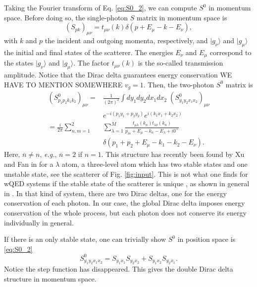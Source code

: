 \documentclass[aps,pra,reprint,amsmath,amssymb]{revtex4-1}
\begin{document}
Taking the Fourier transform of Eq. \eqref{eq:S0_2}, we can compute $S^0$ in momentum space. Before doing so, the single-photon $S$ matrix in momentum space is
\begin{equation}\label{eq:S01_p}
(S_{pk})_{\mu\nu}=t_{\mu\nu}(k)\delta(p+E_\mu-k-E_\nu),
\end{equation}
with $k$ and $p$ the incident and outgoing momenta, respectively, and $|g_\nu\rangle$ and $|g_\mu\rangle$ the initial and final states of the scatterer. The energies $E_\nu$ and $E_\mu$ correspond to the states $|g_\nu\rangle$ and $|g_\mu\rangle$. The factor $t_{\mu\nu}(k)$ is the so-called transmission amplitude. Notice that the Dirac delta guarantees energy conservation {\color{blue}WE HAVE TO MENTION SOMEWHERE $v_g=1$}. Then, the two-photon $S^0$ matrix is
\begin{align}\label{eq:S0_2p}
(S_{p_1p_2k_1k_2}^0)_{\mu\nu}=&\frac{1}{(2\pi)^2}\int  dy_1dy_2dx_1dx_2\; (S_{y_1y_2x_1x_2}^0)_{\mu\nu}\nonumber\\
& e^{-i(p_1y_1+p_2y_2)}  e^{i(k_1x_1+k_2x_2)} \nonumber\\
=  \frac{i}{2\pi}\sum_{n,m=1}^2 &\sum_{\lambda=1}^M  \frac{t_{\mu\lambda}(k_n) t_{\lambda\nu}(k_{\overline{n}})}{p_m+E_\mu -k_n -E_\lambda + i0^+}\nonumber\\
&\delta(p_1+p_2+E_\mu - k_1-k_2-E_\nu).
\end{align}
Here, $\overline{n}\neq n$, \emph{e.g.}, $\overline{n}=2$ if $n=1$. This structure has recently been found by Xu and Fan in \cite{Xu2016} for a $\lambda$ atom, a three-level atom which has two stable states and one unstable state, see the scatterer of Fig. \ref{fig:input}. This is not what one finds for wQED systems if the stable state of the scatterer is unique \cite{fan10,Rephaeli2011,Sanchez-Burillo2016b}, as shown in general in \cite{xu13}. In that kind of system, there are two Dirac deltas, one for the energy conservation of each photon. In our case, the global Dirac delta imposes energy conservation of the whole process, but each photon does not conserve its energy individually in general. %

If there is an only stable state, one can trivially show $S^0$ in position space is \eqref{eq:S0_2}
\begin{equation}
S^0_{y_1y_2x_1x_2} = S_{y_1x_1}S_{y_2x_2} + S_{y_1x_2}S_{y_2x_1}.
\end{equation}
Notice the step function has disappeared. This gives the double Dirac delta structure in momentum space.
\end{document}
